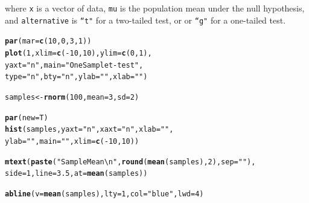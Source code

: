 \documentclass{tufte-book}\usepackage[]{graphicx}\usepackage[]{color}
\makeatletter
\newcommand{\hlnum}[1]{\textcolor[rgb]{0.686,0.059,0.569}{#1}}%
\newcommand{\hlstr}[1]{\textcolor[rgb]{0.192,0.494,0.8}{#1}}%
\newcommand{\hlopt}[1]{\textcolor[rgb]{0,0,0}{#1}}%
\newcommand{\hlstd}[1]{\textcolor[rgb]{0.345,0.345,0.345}{#1}}%
\newcommand{\hlkwb}[1]{\textcolor[rgb]{0.69,0.353,0.396}{#1}}%
\newcommand{\hlkwc}[1]{\textcolor[rgb]{0.333,0.667,0.333}{#1}}%
\newcommand{\hlkwd}[1]{\textcolor[rgb]{0.737,0.353,0.396}{\textbf{#1}}}%
\newenvironment{kframe}{%
 \def\at@end@of@kframe{}%
 \ifinner\ifhmode%
  \def\at@end@of@kframe{\end{minipage}}%
  \begin{minipage}{\columnwidth}%
 \fi\fi%
 \def\FrameCommand##1{\hskip\@totalleftmargin \hskip-\fboxsep
 \colorbox{shadecolor}{##1}\hskip-\fboxsep
     \hskip-\linewidth \hskip-\@totalleftmargin \hskip\columnwidth}%
 \MakeFramed {\advance\hsize-\width
   \@totalleftmargin\z@ \linewidth\hsize
   \@setminipage}}%
 {\par\unskip\endMakeFramed%
 \at@end@of@kframe}
\newenvironment{knitrout}{}{} %
\makeatother
\begin{document}
\begin{footnotesize}
where \texttt{x} is a vector of data, \texttt{mu} is the population mean under the null hypothesis, and \texttt{alternative} is \texttt{``t"} for a two-tailed test, or  or \texttt{``g"} for a one-tailed test.

\begin{marginfigure}
\begin{tiny}
\begin{knitrout}
\color{fgcolor}\begin{kframe}
\begin{alltt}
\hlkwd{par}\hlstd{(}\hlkwc{mar} \hlstd{=} \hlkwd{c}\hlstd{(}\hlnum{10}\hlstd{,} \hlnum{0}\hlstd{,} \hlnum{3}\hlstd{,} \hlnum{1}\hlstd{))}
\hlkwd{plot}\hlstd{(}\hlnum{1}\hlstd{,} \hlkwc{xlim} \hlstd{=} \hlkwd{c}\hlstd{(}\hlopt{-}\hlnum{10}\hlstd{,} \hlnum{10}\hlstd{),} \hlkwc{ylim} \hlstd{=} \hlkwd{c}\hlstd{(}\hlnum{0}\hlstd{,} \hlnum{1}\hlstd{),}
     \hlkwc{yaxt} \hlstd{=} \hlstr{"n"}\hlstd{,} \hlkwc{main} \hlstd{=} \hlstr{"One Sample t-test"}\hlstd{,}
     \hlkwc{type} \hlstd{=} \hlstr{"n"}\hlstd{,} \hlkwc{bty} \hlstd{=} \hlstr{"n"}\hlstd{,} \hlkwc{ylab} \hlstd{=} \hlstr{""}\hlstd{,} \hlkwc{xlab} \hlstd{=} \hlstr{""}\hlstd{)}

\hlstd{samples} \hlkwb{<-} \hlkwd{rnorm}\hlstd{(}\hlnum{100}\hlstd{,} \hlkwc{mean} \hlstd{=} \hlnum{3}\hlstd{,} \hlkwc{sd} \hlstd{=} \hlnum{2}\hlstd{)}

\hlkwd{par}\hlstd{(}\hlkwc{new} \hlstd{= T)}
\hlkwd{hist}\hlstd{(samples,} \hlkwc{yaxt} \hlstd{=} \hlstr{"n"}\hlstd{,} \hlkwc{xaxt} \hlstd{=} \hlstr{"n"}\hlstd{,} \hlkwc{xlab} \hlstd{=} \hlstr{""}\hlstd{,}
     \hlkwc{ylab} \hlstd{=} \hlstr{""}\hlstd{,} \hlkwc{main} \hlstd{=} \hlstr{""}\hlstd{,} \hlkwc{xlim} \hlstd{=} \hlkwd{c}\hlstd{(}\hlopt{-}\hlnum{10}\hlstd{,} \hlnum{10}\hlstd{))}

\hlkwd{mtext}\hlstd{(}\hlkwd{paste}\hlstd{(}\hlstr{"Sample Mean\textbackslash{}n"}\hlstd{,} \hlkwd{round}\hlstd{(}\hlkwd{mean}\hlstd{(samples),} \hlnum{2}\hlstd{),} \hlkwc{sep} \hlstd{=} \hlstr{""}\hlstd{),}
      \hlkwc{side} \hlstd{=} \hlnum{1}\hlstd{,} \hlkwc{line} \hlstd{=} \hlnum{3.5}\hlstd{,} \hlkwc{at} \hlstd{=} \hlkwd{mean}\hlstd{(samples))}

\hlkwd{abline}\hlstd{(}\hlkwc{v} \hlstd{=} \hlkwd{mean}\hlstd{(samples),} \hlkwc{lty} \hlstd{=} \hlnum{1}\hlstd{,} \hlkwc{col} \hlstd{=} \hlstr{"blue"}\hlstd{,} \hlkwc{lwd} \hlstd{=} \hlnum{4}\hlstd{)}


\end{alltt}
\end{kframe}
\end{knitrout}
\end{tiny}
\end{marginfigure}
\end{footnotesize}
\end{document}

